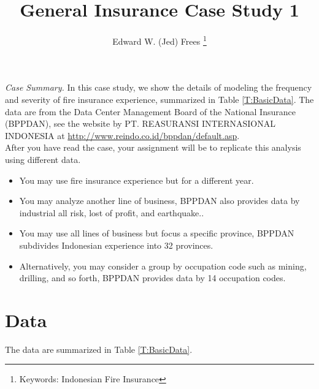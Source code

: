 \documentclass[12pt,letterpaper]{article}
\begin{document}

\title{General Insurance Case Study 1}

\author{Edward W. (Jed) Frees
\thanks{Keywords: Indonesian Fire Insurance} }


\maketitle


 \tableofcontents


\bigskip 

\noindent\textit{Case Summary.} In this case study, we show the details of modeling the frequency and severity of fire insurance experience, summarized in Table \ref{T:BasicData}. 
The data are from the Data Center Management Board of the National Insurance (BPPDAN), see the website by PT. REASURANSI INTERNASIONAL INDONESIA
at \url{http://www.reindo.co.id/bppdan/default.asp}. \\

After you have read the case, your assignment will be to replicate this analysis using different data. 
\begin{itemize}
\item You may use fire insurance experience but for a different year. 
\item You may analyze another line of business, BPPDAN also provides data by industrial all risk, lost of profit, and earthquake..
\item You may use all lines of business but focus a specific province, BPPDAN subdivides Indonesian experience into 32 provinces. 
\item Alternatively, you may consider a group by occupation code such as mining, drilling, and so forth, 
BPPDAN provides data by 14 occupation codes.
\end{itemize}

\newpage

\section{Data}

The data are summarized in Table \ref{T:BasicData}.
\end{document}

